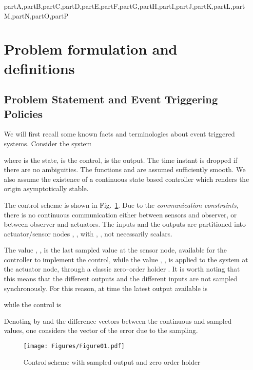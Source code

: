 \documentclass[letterpaper, 10 pt, conference]{ieeeconf}
\def\compile{partA,partB,partC,partD,partE,partF,partG,partH,partI,partJ,partK,partL,partM,partN,partO,partP}
\newenvironment{partA}[1][]{}{}
\newenvironment{partB}[1][]{}{}  \newenvironment{partC}[1][]{}{}
\begin{document}
\begin{xcomment}{\compile}
\begin{partA}
\section{Problem formulation and definitions}

\end{partA}
\begin{partB}


\subsection{Problem Statement and Event Triggering Policies}

\end{partB}
\begin{partC}



We will first recall some known facts and terminologies about event triggered systems. Consider the system 

where  is the state,  is the control,  is the output. The time instant  is dropped if there are no ambiguities. The functions  and  are assumed sufficiently smooth. We also assume the existence of a continuous state based controller which renders the origin asymptotically stable.


The control scheme is shown in Fig.~\ref{feedback scheme}. Due to the \emph{communication constraints}, there is no continuous communication either between sensors and observer, or between observer and actuators. The inputs and the outputs are partitioned into actuator/sensor nodes , , with , , not necessarily scalars.

The value , , is the last sampled value at the  sensor node, available for the controller to implement the control, while the value , , is applied to the system at the  actuator node, through a classic zero--order holder . It is worth noting that this means that the different outputs  and the different inputs  are not sampled synchronously. For this reason, at time  the latest output available is 

while the control is 

Denoting by  and  the difference vectors between the continuous and sampled values, one considers the vector  of the error due to the sampling.

\begin{figure}[h!]
\centerline{\texttt{[image: Figures/Figure01.pdf]}} 
\caption{Control scheme with sampled output and zero order holder}
\label{feedback scheme}
\end{figure}


\end{partC}
\end{xcomment}
\end{document}
